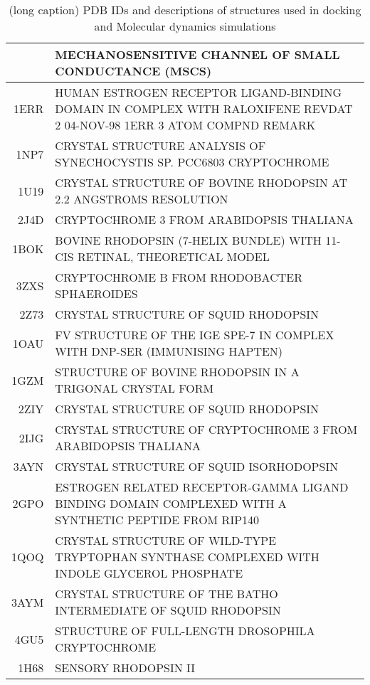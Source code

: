 \begin{table}[tbp]
\centering
\begin{tabular}{rl}
  \hline
\hline
 & MECHANOSENSITIVE CHANNEL OF SMALL CONDUCTANCE (MSCS) \\ 
  \hline
1ERR & HUMAN ESTROGEN RECEPTOR LIGAND-BINDING DOMAIN IN COMPLEX WITH RALOXIFENE REVDAT 2 04-NOV-98 1ERR 3 ATOM COMPND REMARK \\ 
  1NP7 & CRYSTAL STRUCTURE ANALYSIS OF SYNECHOCYSTIS SP. PCC6803 CRYPTOCHROME  \\ 
  1U19 & CRYSTAL STRUCTURE OF BOVINE RHODOPSIN AT 2.2 ANGSTROMS RESOLUTION  \\ 
  2J4D & CRYPTOCHROME 3 FROM ARABIDOPSIS THALIANA  \\ 
  1BOK & BOVINE RHODOPSIN (7-HELIX BUNDLE) WITH 11-CIS RETINAL, THEORETICAL MODEL  \\ 
  3ZXS & CRYPTOCHROME B FROM RHODOBACTER SPHAEROIDES  \\ 
  2Z73 & CRYSTAL STRUCTURE OF SQUID RHODOPSIN  \\ 
  1OAU & FV STRUCTURE OF THE IGE SPE-7 IN COMPLEX WITH DNP-SER (IMMUNISING HAPTEN)  \\ 
  1GZM & STRUCTURE OF BOVINE RHODOPSIN IN A TRIGONAL CRYSTAL FORM  \\ 
  2ZIY & CRYSTAL STRUCTURE OF SQUID RHODOPSIN  \\ 
  2IJG & CRYSTAL STRUCTURE OF CRYPTOCHROME 3 FROM ARABIDOPSIS THALIANA  \\ 
  3AYN & CRYSTAL STRUCTURE OF SQUID ISORHODOPSIN  \\ 
  2GPO & ESTROGEN RELATED RECEPTOR-GAMMA LIGAND BINDING DOMAIN COMPLEXED WITH A SYNTHETIC PEPTIDE FROM RIP140  \\ 
  1QOQ & CRYSTAL STRUCTURE OF WILD-TYPE TRYPTOPHAN SYNTHASE COMPLEXED WITH INDOLE GLYCEROL PHOSPHATE  \\ 
  3AYM & CRYSTAL STRUCTURE OF THE BATHO INTERMEDIATE OF SQUID RHODOPSIN  \\ 
  4GU5 & STRUCTURE OF FULL-LENGTH DROSOPHILA CRYPTOCHROME  \\ 
  1H68 & SENSORY RHODOPSIN II  \\ 
   \hline
\hline
\end{tabular}
\caption[(short caption) PDB IDs and descriptions of structures used in comparative analyses]{(long caption) PDB IDs and descriptions of structures used in docking and Molecular dynamics simulations} 
\label{tab:AppData_PDB}
\end{table}